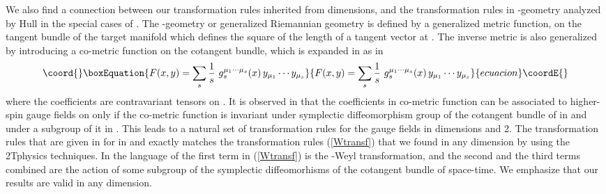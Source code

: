 \documentclass[a4paper,12pt]{article}
\begin{document}
We also find a connection between our transformation rules inherited from \coordHE{} dimensions, and the transformation rules in \coordHE{}-geometry
analyzed by Hull \cite{Hull} in the special cases of \coordHE{}. The \coordHE{}-geometry or generalized Riemannian geometry is defined by a generalized
metric function, on the tangent bundle \coordHE{} of the target manifold \coordHE{}
which defines the square of the length of a tangent vector \coordHE{} at \coordHE{}. The inverse metric is also generalized by introducing a
co-metric function \coordHE{} on the cotangent bundle, which is expanded in \coordHE{}
as in \cite{Hull}
\begin{equation}\coord{}\boxEquation{
F(x,y)=\sum_{s}\frac{1}{s}\,\,g_{s}^{\mu _{1}\cdots \mu _{s}}(x)\,y_{\mu
_{1}}\cdots y_{\mu _{s}}
}{
F(x,y)=\sum_{s}\frac{1}{s}\,\,g_{s}^{\mu _{1}\cdots \mu _{s}}(x)\,y_{\mu
_{1}}\cdots y_{\mu _{s}}
}{ecuacion}\coordE{}\end{equation}
where the coefficients \coordHE{} are
contravariant tensors on \coordHE{}. It is observed in \cite{Hull} that the
coefficients \coordHE{} in co-metric function can
be associated to higher-spin gauge fields on \coordHE{} only if the co-metric
function is invariant under symplectic diffeomorphism group of the cotangent
bundle of \coordHE{} in \coordHE{} and under a subgroup of it in \coordHE{}. This leads to a
natural set of transformation rules for the gauge fields \coordHE{} in dimensions \coordHE{} and 2. The transformation rules
that are given in \cite{Hull} for \coordHE{} in \coordHE{} and \coordHE{} exactly matches the transformation rules (\ref{Wtransf}) that
we found in any dimension by using the 2Tphysics techniques. In the language
of \cite{Hull} the first term in (\ref{Wtransf}) is the \coordHE{}-Weyl
transformation, and the second and the third terms combined are the action
of some subgroup of the symplectic diffeomorhisms of the cotangent bundle of
space-time. We emphasize that our results are valid in any dimension.
\end{document}
